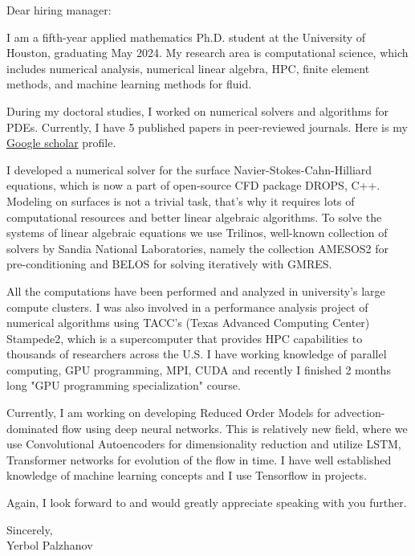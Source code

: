 \documentclass[11pt,letterpaper]{letter}
\begin{document}
 
	\begin{letter}{Dear hiring manager:} 
		\opening{} 
		
	I am a fifth-year applied mathematics Ph.D. student at the University of Houston, graduating May 2024. My research area is computational science, which includes numerical analysis, numerical linear algebra, HPC, finite element methods, and machine learning methods for fluid.

During my doctoral studies, I worked on numerical solvers and algorithms for PDEs. Currently, I have 5 published papers in peer-reviewed journals. Here is my \href{https://scholar.google.com/citations?user=OCklKaMAAAAJ&hl=en}{Google scholar} profile.

I developed a numerical solver for the surface Navier-Stokes-Cahn-Hilliard equations, which is now a part of open-source CFD package DROPS, C++. Modeling on surfaces is not a trivial task, that's why it requires lots of computational resources and better linear algebraic algorithms. To solve the systems of linear algebraic equations we use Trilinos, well-known collection of solvers by Sandia National Laboratories, namely the collection AMESOS2 for pre-conditioning and BELOS for solving iteratively with GMRES. 

All the computations have been performed and analyzed in university's large compute clusters. I was also involved in a performance analysis project of numerical algorithms using TACC's (Texas Advanced Computing Center) Stampede2, which is  a supercomputer that provides HPC capabilities to thousands of researchers across the U.S. I have working knowledge of parallel computing, GPU programming, MPI, CUDA and recently I finished 2 months long "GPU programming specialization" course.

Currently, I am working on developing Reduced Order Models for advection-dominated flow using deep neural networks. This is relatively new field, where we use Convolutional Autoencoders for dimensionality reduction and utilize LSTM, Transformer networks for evolution of the flow in time. I have well established knowledge of machine learning concepts and I use Tensorflow in projects.

	
	Again, I look forward to and would greatly appreciate speaking with you further. 
	
	Sincerely,\\
	Yerbol Palzhanov
	
	 
		
	\end{letter} 
\end{document}
